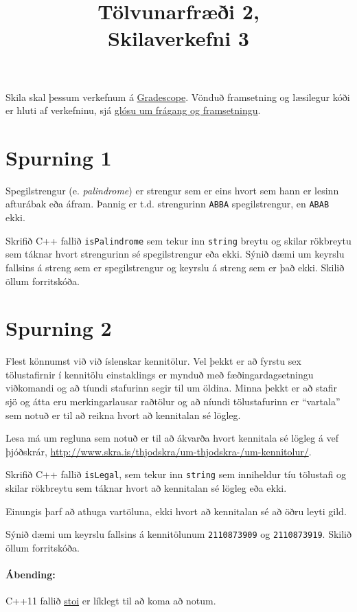 \documentclass{article}
\title{Tölvunarfræði 2, \semester \\ Skilaverkefni 3}
\author{}
\begin{document}
\maketitle
{}

Skila skal þessum verkefnum á \href{https://gradescope.com/courses/5640}{Gradescope}. Vönduð framsetning og læsilegur kóði er hluti af verkefninu, sjá \href{https://piazza.com/class/ixkicfen49l111?cid=52}{glósu um frágang og framsetningu}.


\section{Spurning 1}
Spegilstrengur (e. \emph{palindrome}) er strengur sem er eins hvort sem hann er lesinn afturábak eða áfram. Þannig er t.d. strengurinn \texttt{ABBA} spegilstrengur, en \texttt{ABAB} ekki.

Skrifið C++ fallið \texttt{isPalindrome} sem tekur inn \texttt{string} breytu og skilar rökbreytu sem táknar hvort strengurinn sé spegilstrengur eða ekki. Sýnið dæmi um keyrslu fallsins á streng sem er spegilstrengur og keyrslu á streng sem er það ekki. Skilið öllum forritskóða.

\section{Spurning 2}
Flest könnumst við við íslenskar kennitölur. Vel þekkt er að fyrstu sex tölustafirnir í kennitölu einstaklings er mynduð með fæðingardagsetningu viðkomandi og að tíundi stafurinn segir til um öldina.
Minna þekkt er að stafir sjö og átta eru merkingarlausar raðtölur og að níundi tölustafurinn er ``vartala'' sem notuð er til að reikna hvort að kennitalan sé lögleg.

Lesa má um regluna sem notuð er til að ákvarða hvort kennitala sé lögleg á vef þjóðskrár, \url{http://www.skra.is/thjodskra/um-thjodskra-/um-kennitolur/}.

Skrifið C++ fallið \texttt{isLegal}, sem tekur inn \texttt{string} sem inniheldur tíu tölustafi og skilar rökbreytu sem táknar hvort að kennitalan sé lögleg eða ekki.

Einungis þarf að athuga vartöluna, ekki hvort að kennitalan sé að öðru leyti gild.

Sýnið dæmi um keyrslu fallsins á kennitölunum \texttt{2110873909} og \texttt{2110873919}. Skilið öllum forritskóða.

\paragraph{Ábending:} C++11 fallið \href{http://www.cplusplus.com/reference/string/stoi/}{stoi} er líklegt til að koma að notum.
\newpage
\end{document}
